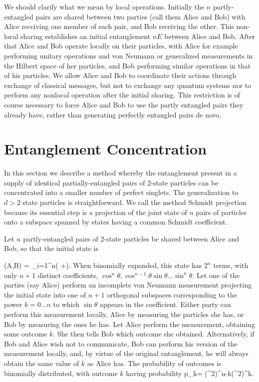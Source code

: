 We should clarify what we mean by local operations.  Initially
the $n$ partly-entangled pairs are shared between two parties
(call them Alice and Bob) with Alice receiving one member of each pair,
and Bob receiving the other.  This
non-local sharing establishes an initial entanglement
$nE$ between Alice and Bob.  After that Alice and Bob operate
locally on their particles, with Alice for example performing
unitary operations and von Neumann or generalized measurements in
the Hilbert space of her particles, and Bob
performing similar operations in that of his particles.
We allow Alice and Bob to coordinate their actions through
exchange of classical messages, but not to exchange
any quantum systems nor to perform any nonlocal operation after
the initial sharing.  This restriction is of course necessary to
force Alice and Bob to use the partly entangled pairs they
already have, rather than generating perfectly entangled pairs de
novo.
 
 
\section{Entanglement Concentration}
In this section we describe a method whereby the entanglement present in a
supply of identical partially-entangled pairs of 2-state particles can be
concentrated into a smaller number of perfect singlets.  The generalization
to $d>2$ state particles is straightforward.  We call the method Schmidt
projection because its essential step is a projection of the joint state of
$n$ pairs of particles onto a subspace spanned by states having a common Schmidt
coefficient.
 
Let $n$ partly-entangled pairs of 2-state particles be shared between Alice
and Bob, so that the initial state is
 
\beq
\Psi(A,B) = \prod_{i=1}^n(\cos\theta{}
                   +\sin\theta{}).
\eeq
When binomially expanded, this state has $2^n$ terms, with only
$n+1$ distinct coefficients, $\cos^n\theta, \cos^{n-1}\theta \sin
\theta...\sin^n\theta$.  Let one of the parties (say Alice)
perform an incomplete von Neumann measurement projecting the
initial state into one of $n+1$ orthogonal subspaces
corresponding to the power $k=0...n$ to which $\sin\theta$
appears in the coefficient.  Either party can perform this
measurement locally, Alice by measuring the particles she has,
or Bob by measuring the ones he has.  Let Alice perform
the measurement, obtaining some outcome $k$.  She then tells Bob
which outcome she obtained.  Alternatively, if Bob and Alice
wish not to communicate, Bob can perform his version of the
measurement locally, and, by virtue of the original
entanglement, he will always obtain the same value of $k$ as
Alice has.   The probability of outcomes is binomially
distributed, with outcome $k$ having probability
\beq
p_k= (\cos^2\theta)^{n-k}(\sin^2\theta)^k.
\eeq
 

